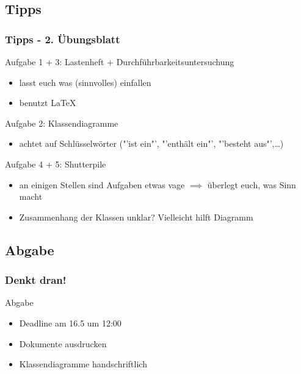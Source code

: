 \documentclass[18pt]{beamer}
\begin{document}
	\subsection{Tipps}
	\begin{frame}
		\frametitle{Tipps - 2. Übungsblatt}
		\begin{small}
			\begin{exampleblock}{Aufgabe 1 + 3: Lastenheft + Durchführbarkeitsuntersuchung}
				\begin{itemize}
					\item lasst euch was (sinnvolles) einfallen
					\item benutzt \LaTeX
				\end{itemize}
			\end{exampleblock}
			\pause
			\begin{exampleblock}{Aufgabe 2: Klassendiagramme}
				\begin{itemize}
					\item achtet auf Schlüsselwörter ("'ist ein"', "'enthält ein"', "'besteht aus"',\dots)
				\end{itemize}
			\end{exampleblock}
			\pause
			\begin{exampleblock}{Aufgabe 4 + 5: Shutterpile}
				\begin{itemize}
					\item an einigen Stellen sind Aufgaben etwas vage
					\linebreak $\implies$ überlegt euch, was Sinn macht
					\item Zusammenhang der Klassen unklar? Vielleicht hilft Diagramm
				\end{itemize}
			\end{exampleblock}
		\end{small}
	\end{frame}
	
	\subsection{Abgabe}
	\begin{frame}
		\frametitle{Denkt dran!}
		\begin{alertblock}{Abgabe}
			\begin{itemize}
				\item Deadline am 16.5 um 12:00
				\item Dokumente ausdrucken
				\item Klassendiagramme handschriftlich
			\end{itemize}
		\end{alertblock}
	\end{frame}
		
\end{document}
